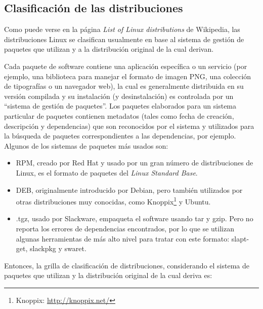\subsection{Clasificación de las distribuciones}

Como puede verse en la página \emph{List of Linux distributions} de Wikipedia, las distribuciones Linux se clasifican usualmente en base al sistema de gestión de paquetes que utilizan y a la distribución original de la cual derivan.

Cada paquete de software contiene una aplicación específica o un servicio (por ejemplo, una biblioteca para manejar el formato de imagen PNG, una colección de tipografías o un navegador web), la cual es generalmente distribuida en su versión compilada y su instalación (y desinstalación) es controlada por un ``sistema de gestión de paquetes''. Los paquetes elaborados para un sistema particular de paquetes contienen metadatos (tales como fecha de creación, descripción y dependencias) que son reconocidos por el sistema y utilizados para la búsqueda de paquetes correspondientes a las dependencias, por ejemplo. Algunos de los sistemas de paquetes más usados son:

\begin{itemize}
		\item RPM, creado por Red Hat y usado por un gran número de distribuciones de Linux, es el formato de paquetes del \emph{Linux Standard Base}.
		\item DEB, originalmente introducido por Debian, pero también utilizados por otras distribuciones muy conocidas, como Knoppix\footnote{Knoppix: \url{http://knoppix.net/}} y Ubuntu.
		\item .tgz, usado por Slackware, empaqueta el software usando tar y gzip. Pero no reporta los errores de dependencias encontrados, por lo que se utilizan algunas herramientas de más alto nivel para tratar con este formato: slapt-get, slackpkg y swaret. 
\end{itemize}

Entonces, la grilla de clasificación de distribuciones, considerando el sistema de paquetes que utilizan y la distribución original de la cual deriva es:

